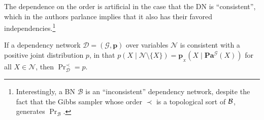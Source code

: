 \documentclass[letterpaper]{article} %
\theoremstyle{plain}
\theoremstyle{definition}
\theoremstyle{remark}
\newcommand{\begthm}[3][]{\begin{#2}[{name=#1},restate=#3,label=#3]}
\newcommand\mat[1]{\mathbf{#1}}
\newcommand{\bp}[1][L]{\mat{p}_{\!_{#1}\!}}
\newcommand{\N}{\mathcal N}
\newcommand\Pa{\mathbf{Pa}}
\newcommand{\Gr}{\mathcal G}
\begin{document}
{%
%
%

The dependence on the order is artificial in the case that the DN is
``consistent'', which in the authors parlance implies that it also has 
their favored independencies.\footnote{Interestingly, a BN $\mathcal
B$ is an ``inconsistent'' dependency network, despite the fact that
the Gibbs sampler whose order $\prec$ is a topological sort  of $\cal
B$, generates $\Pr_{\mathcal B}$.} 
\begthm[\citeauthor{heckerman2000dependency}]{theorem}{thm:dns-uniq}
If a dependency network $\mathcal D \!=\! (\Gr, \mat p)$ over variables $\N$ is consistent with a positive joint distribution $p$,
in that $p(X \mid \N\setminus \{X\}) = \bp[X](X \mid \Pa^{\Gr}(X))$ for all $X \in \N$,
 then $\Pr_{\mathcal D}^\prec = p$.
\end{theorem}

}
\end{document}
